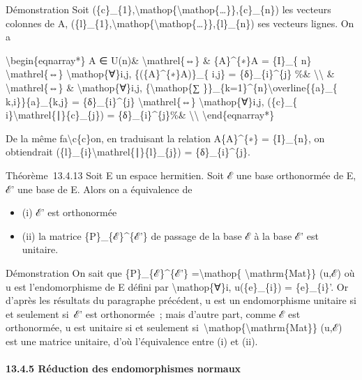 \documentclass[]{article}
\begin{document}
Démonstration Soit
(\{c\}\_\{1\},\textbackslash{}mathop\{\textbackslash{}mathop\{\ldots{}\}\},\{c\}\_\{n\})
les vecteurs colonnes de A,
(\{l\}\_\{1\},\textbackslash{}mathop\{\textbackslash{}mathop\{\ldots{}\}\},\{l\}\_\{n\})
ses vecteurs lignes. On a

\textbackslash{}begin\{eqnarray*\} A ∈ U(n)\&
\textbackslash{}mathrel\{⇔\} \& \{A\}\^{}\{∗\}A = \{I\}\_\{ n\}
\textbackslash{}mathrel\{⇔\} \textbackslash{}mathop\{∀\}i,j,
\{(\{A\}\^{}\{∗\}A)\}\_\{ i,j\} = \{δ\}\_\{i\}\^{}\{j\} \%\&
\textbackslash{}\textbackslash{} \& \textbackslash{}mathrel\{⇔\} \&
\textbackslash{}mathop\{∀\}i,j, \{\textbackslash{}mathop\{∑
\}\}\_\{k=1\}\^{}\{n\}\textbackslash{}overline\{\{a\}\_\{
k,i\}\}\{a\}\_\{k,j\} = \{δ\}\_\{i\}\^{}\{j\}
\textbackslash{}mathrel\{⇔\} \textbackslash{}mathop\{∀\}i,j, (\{c\}\_\{
i\}\textbackslash{}mathrel\{∣\}\{c\}\_\{j\}) = \{δ\}\_\{i\}\^{}\{j\}\%\&
\textbackslash{}\textbackslash{} \textbackslash{}end\{eqnarray*\}

De la même fa\textbackslash{}c\{c\}on, en traduisant la relation
A\{A\}\^{}\{∗\} = \{I\}\_\{n\}, on obtiendrait
(\{l\}\_\{i\}\textbackslash{}mathrel\{∣\}\{l\}\_\{j\}) =
\{δ\}\_\{i\}\^{}\{j\}.

Théorème~13.4.13 Soit E un espace hermitien. Soit ℰ une base orthonormée
de E, ℰ' une base de E. Alors on a équivalence de

\begin{itemize}
\itemsep1pt\parskip0pt
\item
  (i) ℰ' est orthonormée
\item
  (ii) la matrice \{P\}\_\{ℰ\}\^{}\{ℰ'\} de passage de la base ℰ à la
  base ℰ' est unitaire.
\end{itemize}

Démonstration On sait que \{P\}\_\{ℰ\}\^{}\{ℰ'\}
=\textbackslash{}mathop\{ \textbackslash{}mathrm\{Mat\}\} (u,ℰ) où u est
l'endomorphisme de E défini par \textbackslash{}mathop\{∀\}i,
u(\{e\}\_\{i\}) = \{e\}\_\{i\}'. Or d'après les résultats du paragraphe
précédent, u est un endomorphisme unitaire si et seulement si~ℰ' est
orthonormée~; mais d'autre part, comme ℰ est orthonormée, u est unitaire
si et seulement
si~\textbackslash{}mathop\{\textbackslash{}mathrm\{Mat\}\} (u,ℰ) est une
matrice unitaire, d'où l'équivalence entre (i) et (ii).

\paragraph{13.4.5 Réduction des endomorphismes normaux}
\end{document}
